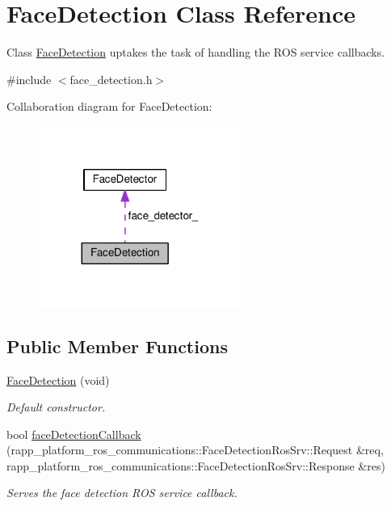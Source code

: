 \hypertarget{classFaceDetection}{\section{Face\-Detection Class Reference}
\label{classFaceDetection}
}


Class \hyperlink{classFaceDetection}{Face\-Detection} uptakes the task of handling the R\-O\-S service callbacks.  




{\ttfamily \#include $<$face\-\_\-detection.\-h$>$}



Collaboration diagram for Face\-Detection\-:
\nopagebreak
\begin{figure}[H]
\begin{center}
\leavevmode
\includegraphics[width=188pt]{classFaceDetection__coll__graph}
\end{center}
\end{figure}
\subsection*{Public Member Functions}
\begin{DoxyCompactItemize}
\item 
\hyperlink{classFaceDetection_ae047cd60fcdc6a2b0fbfd06410c38529}{Face\-Detection} (void)
\begin{DoxyCompactList}\small\item\em Default constructor. \end{DoxyCompactList}\item 
bool \hyperlink{classFaceDetection_a72f1e1890fcf06eae61016ad42506314}{face\-Detection\-Callback} (rapp\-\_\-platform\-\_\-ros\-\_\-communications\-::\-Face\-Detection\-Ros\-Srv\-::\-Request \&req, rapp\-\_\-platform\-\_\-ros\-\_\-communications\-::\-Face\-Detection\-Ros\-Srv\-::\-Response \&res)
\begin{DoxyCompactList}\small\item\em Serves the face detection R\-O\-S service callback. \end{DoxyCompactList}\end{DoxyCompactItemize}
